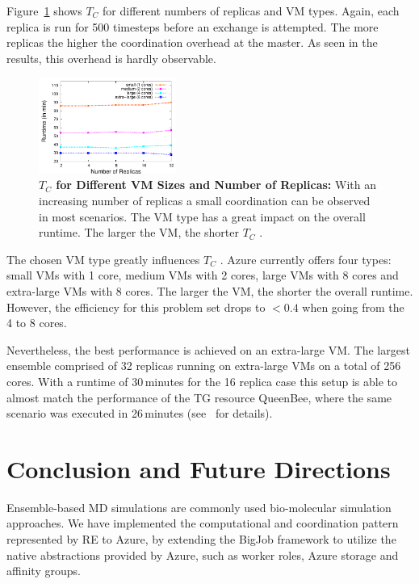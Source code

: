 \documentclass[conference,final]{IEEEtran}
\newcommand{\up}{\vspace*{-1em}}
\newcommand{\tc}{$T_{C}$ }
\begin{document}
Figure~\ref{fig:performance_repex_scaleout_vmsizes} shows \tc
for different numbers of replicas and VM types. 
Again, each replica is run for 500 timesteps before an exchange
is attempted. The more replicas the higher the coordination overhead
at the master. As seen in the results, this overhead is hardly
observable.
\begin{figure}[ht]
    \centering
        \includegraphics[width=0.4\textwidth]{performance/repex-azure.pdf}
    \caption{\textbf{\tc for Different VM Sizes and Number of Replicas:} With
    an increasing number of replicas a small coordination can be observed in most 
    scenarios. The VM type has a great impact on the overall runtime. The larger
    the VM, the shorter \tc. }
    \label{fig:performance_repex_scaleout_vmsizes}
    \up
\end{figure}

The chosen VM type greatly influences \tc. Azure currently offers four
types: small VMs with 1 core, medium VMs with 2 cores, large VMs with 8 cores
and extra-large VMs with 8 cores. The larger the VM, the shorter the overall runtime.
However, the efficiency for this problem set drops to $<0.4$ when going from the 4 to 8 cores. 

Nevertheless, the best performance is achieved on an extra-large
VM. The largest ensemble comprised of 32 replicas running on
extra-large VMs on a total of 256 cores.  With a runtime of
30\,minutes for the 16 replica case this setup is able to almost match
the performance of the TG resource QueenBee, where the same scenario
was executed in 26\,minutes (see~\cite{repex_ptrsb} for details).

\up
\section{Conclusion and Future Directions}
\up

Ensemble-based MD simulations %
are commonly used bio-molecular simulation
approaches. %
We have implemented the computational and coordination pattern
represented by RE to Azure, by extending the BigJob framework to
utilize the native abstractions provided by Azure, such as worker
roles, Azure storage and affinity groups.
\end{document}
